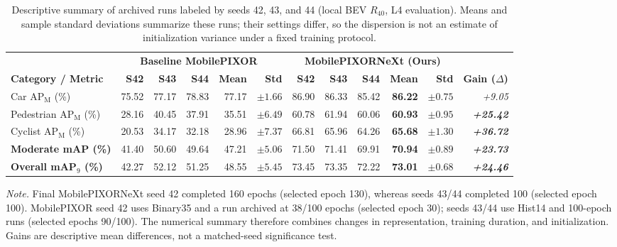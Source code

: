 \begin{table}[t]
\centering\small
\caption{Descriptive summary of archived runs labeled by seeds 42, 43, and 44 (local BEV $R_{40}$, L4 evaluation). Means and sample standard deviations summarize these runs; their settings differ, so the dispersion is not an estimate of initialization variance under a fixed training protocol.}
\label{tab:seed_robustness}
\setlength{\tabcolsep}{4.5pt}
\begin{tabular}{@{}lrrrrrrrrrrr@{}}
\toprule
& \multicolumn{5}{c}{\textbf{Baseline MobilePIXOR~\cite{nguyen2024indoor}}} & \multicolumn{5}{c}{\textbf{MobilePIXORNeXt (Ours)}} & \\
\cmidrule(lr){2-6} \cmidrule(lr){7-11}
\textbf{Category / Metric} & \textbf{S42} & \textbf{S43} & \textbf{S44} & \textbf{Mean} & \textbf{Std} & \textbf{S42} & \textbf{S43} & \textbf{S44} & \textbf{Mean} & \textbf{Std} & \textbf{Gain ($\Delta$)} \\
\midrule
Car AP$_{\mathrm{M}}$ (\%) & 75.52 & 77.17 & 78.83 & 77.17 & $\pm 1.66$ & 86.90 & 86.33 & 85.42 & \textbf{86.22} & $\mathbf{\pm 0.75}$ & \textit{+9.05} \\
Pedestrian AP$_{\mathrm{M}}$ (\%) & 28.16 & 40.45 & 37.91 & 35.51 & $\pm 6.49$ & 60.78 & 61.94 & 60.06 & \textbf{60.93} & $\mathbf{\pm 0.95}$ & \textit{\textbf{+25.42}} \\
Cyclist AP$_{\mathrm{M}}$ (\%) & 20.53 & 34.17 & 32.18 & 28.96 & $\pm 7.37$ & 66.81 & 65.96 & 64.26 & \textbf{65.68} & $\mathbf{\pm 1.30}$ & \textit{\textbf{+36.72}} \\
\midrule
\textbf{Moderate mAP (\%)} & 41.40 & 50.60 & 49.64 & 47.21 & $\pm 5.06$ & 71.50 & 71.41 & 69.91 & \textbf{70.94} & $\mathbf{\pm 0.89}$ & \textit{\textbf{+23.73}} \\
\textbf{Overall mAP$_{9}$ (\%)} & 42.27 & 52.12 & 51.25 & 48.55 & $\pm 5.45$ & 73.45 & 73.35 & 72.22 & \textbf{73.01} & $\mathbf{\pm 0.68}$ & \textit{\textbf{+24.46}} \\
\bottomrule
\end{tabular}
\par\vspace{2pt}
{\footnotesize \textit{Note.} Final MobilePIXORNeXt seed 42 completed 160 epochs (selected epoch 130), whereas seeds 43/44 completed 100 (selected epoch 100). MobilePIXOR seed 42 uses Binary35 and a run archived at 38/100 epochs (selected epoch 30); seeds 43/44 use Hist14 and 100-epoch runs (selected epochs 90/100). The numerical summary therefore combines changes in representation, training duration, and initialization. Gains are descriptive mean differences, not a matched-seed significance test.}
\end{table}
